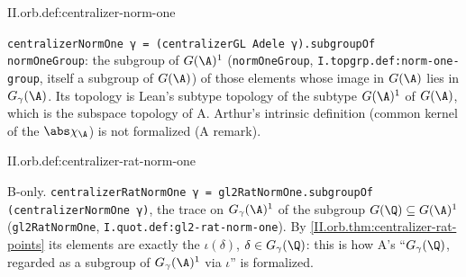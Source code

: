 \begin{definition}
\end{definition}
\begin{tfformal}{II.orb.def:centralizer-norm-one}
\begin{tffidelity}
\texttt{centralizerNormOne γ = (centralizerGL Adele γ).subgroupOf normOneGroup}: the subgroup of $G(\A)^1$ (\texttt{normOneGroup}, \texttt{I.topgrp.def:norm-one-group}, itself a subgroup of $G(\A)$) of those elements whose image in $G(\A)$ lies in $G_\gamma(\A)$. Its topology is Lean's subtype topology of the subtype $G(\A)^1$ of $G(\A)$, which is the subspace topology of A. Arthur's intrinsic definition (common kernel of the $\abs\chi_\A$) is not formalized (A remark).
\end{tffidelity}
\end{tfformal}

\begin{definition}
\bonly
{}
\end{definition}
\begin{tfformal}{II.orb.def:centralizer-rat-norm-one}
\begin{tffidelity}
B-only. \texttt{centralizerRatNormOne γ = gl2RatNormOne.subgroupOf (centralizerNormOne γ)}, the trace on $G_\gamma(\A)^1$ of the subgroup $G(\Q)\subseteq G(\A)^1$ (\texttt{gl2RatNormOne}, \texttt{I.quot.def:gl2-rat-norm-one}). By \cref{II.orb.thm:centralizer-rat-points} its elements are exactly the $\iota(\delta)$, $\delta\in G_\gamma(\Q)$: this is how A's ``$G_\gamma(\Q)$, regarded as a subgroup of $G_\gamma(\A)^1$ via $\iota$'' is formalized.
\end{tffidelity}
\end{tfformal}

